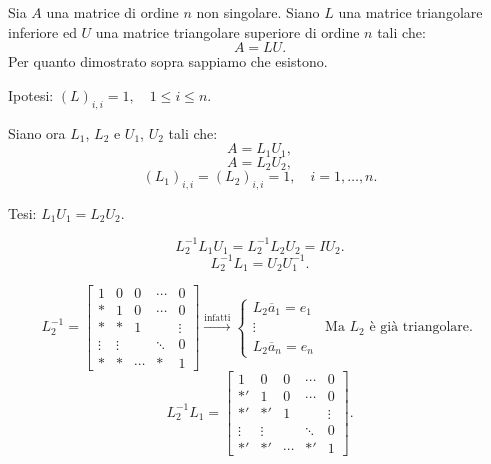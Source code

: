\begin{dimo}
Sia $A$ una matrice di ordine $n$ non singolare.
Siano $L$ una matrice triangolare inferiore ed $U$ una matrice triangolare
superiore di ordine $n$ tali che:
\[A = LU.\]
Per quanto dimostrato sopra sappiamo che esistono.

\begin{flushleft}
Ipotesi: $(L)_{i,i} = 1, \quad  1 \leq i \leq n$.
\end{flushleft}
Siano ora $L_1$, $L_2$ e $U_1$, $U_2$ tali che:
\[A =  L_1U_1,\]
\[A  = L_2U_2,\]
\[
(L_1)_{i,i} = (L_2)_{i,i} = 1, \quad i = 1,\ldots, n.
\]

\begin{flushleft}
Tesi: $L_1U_1 = L_2U_2.$
\end{flushleft}

\[
L_2^{-1}L_1U_1 = L_2^{-1}L_2U_2
              = IU_2.
\]
\[L_2^{-1}L_1 = U_2U_1^{-1}. \]

\[
L_2^{-1}=
\left[
\begin{array}{ccccc}
1      & 0      & 0      & \cdots & 0 \\
*      & 1      & 0      & \cdots & 0 \\
*      & *      & 1      &        & \vdots \\
\vdots & \vdots &        & \ddots & 0  \\
*      & *      & \cdots & *      & 1
\end{array} \right]
\stackrel{\textrm{infatti}}{\longrightarrow}
\left\{\begin{array}{lr}
L_2\overline{a}_1 = e_1 & \\
\vdots & \textrm{Ma $L_2$ è già triangolare.} \\
L_2\overline{a}_n = e_n
\end{array}\right.
\]
\[
L_2^{-1}L_1 =
\left[
\begin{array}{ccccc}
1      & 0      & 0      & \cdots & 0 \\
*'      & 1      & 0      & \cdots & 0 \\
*'      & *'      & 1      &        & \vdots \\
\vdots & \vdots &        & \ddots & 0  \\
*'      & *'      & \cdots & *'      & 1
\end{array} \right].
\]


\end{dimo}
